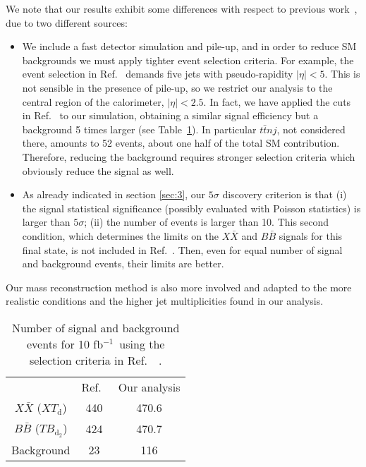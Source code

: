 \documentclass[12pt,a4paper]{article}
\newcommand{\fbin}{fb$^{-1}$}
\newcommand{\BB}{B \bar B}
\newcommand{\XX}{X \bar X}
\newcommand{\TBD}{TB_{\text{d}_2}}
\newcommand{\XTd}{XT_\text{d}}
\begin{document}
We note that
our results exhibit some differences with respect to previous work~\cite{Contino:2008hi}, due to two different sources:
\begin{itemize}
\item We include a fast detector simulation and pile-up, and in order to reduce SM backgrounds we must apply tighter event selection criteria. For example, the event selection in Ref.~\cite{Contino:2008hi} demands five jets with pseudo-rapidity $|\eta| < 5$. This is not sensible in the presence of pile-up, so we restrict our analysis to the central region of the calorimeter, $|\eta| < 2.5$. In fact, we have applied the cuts in Ref.~\cite{Contino:2008hi} to our simulation, obtaining a similar signal efficiency but a background 5 times larger (see Table~\ref{tab:comp-contino}). In particular $t \bar t nj$, not considered there, amounts to 52 events, about one half of the total SM contribution.
Therefore, reducing the background requires stronger selection criteria which obviously reduce the signal as well.
%
\item As already indicated in section \ref{sec:3}, our $5\sigma$ discovery criterion is that (i) the signal statistical significance (possibly evaluated with Poisson statistics) is larger than $5\sigma$; (ii) the number of events is larger than 10. This second condition, which determines the limits on the $\XX$ and $\BB$ signals for this final state, is not included in Ref.~\cite{Contino:2008hi}. Then, even for equal number of signal and background events, their limits are better.
\end{itemize}
Our mass reconstruction method is also more involved and adapted to the more realistic conditions and the higher jet multiplicities found in our analysis.

\begin{table}[t]
\begin{center}
\begin{tabular}{ccc}
& Ref.~\cite{Contino:2008hi} & Our analysis \\[1mm]
$\XX$ ($\XTd$) & 440  & 470.6 \\
$\BB$ ($\TBD$) & 424  & 470.7 \\
Background          & 23   & 116  
\end{tabular}
\end{center}
\caption{Number of signal and background events for 10 \fbin\ using the selection criteria in Ref.~~\cite{Contino:2008hi}.}
\label{tab:comp-contino}
\end{table}
\end{document}
